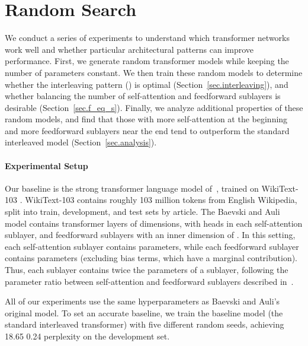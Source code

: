 \documentclass[11pt,a4paper]{article}
\begin{document}
\section{Random Search} \label{sec.exploration}

We conduct a series of experiments to understand which transformer networks work well and whether particular architectural patterns can  improve performance.
First, we generate random transformer models while keeping the number of parameters constant.
We then train these random models to determine whether the interleaving pattern ({\Large \texttt{}}\thinspace) is optimal (Section~\ref{sec.interleaving}), and whether balancing the number of self-attention and feedforward sublayers is desirable (Section~\ref{sec.f_eq_s}).
Finally, we analyze additional properties of these random models, and find that those with more self-attention at the beginning and more feedforward sublayers near the end tend to outperform the standard interleaved model (Section~\ref{sec.analysis}).



\paragraph{Experimental Setup}
Our baseline is the strong transformer language model of~\citet{baevski2018adaptive}, trained on WikiText-103 \citep{merity2016pointer}. WikiText-103 contains roughly 103 million tokens from English Wikipedia, split into train, development, and test sets by article.  The Baevski and Auli model contains  transformer layers of  dimensions, with  heads in each self-attention sublayer, and feedforward sublayers with an inner dimension of .
In this setting, each self-attention sublayer contains  parameters, while each feedforward sublayer contains  parameters (excluding bias terms, which have a marginal contribution).
Thus, each {\Large \texttt{}} sublayer contains twice the parameters of a {\Large \texttt{}} sublayer, following the parameter ratio between self-attention and feedforward sublayers described in~\citet{AIAYN}.

All of our experiments use the same hyperparameters as Baevski and Auli's original model.
To set an accurate baseline, we train the baseline model (the standard interleaved transformer) with five different random seeds, achieving 18.65  0.24 perplexity on the development set. 
\end{document}
